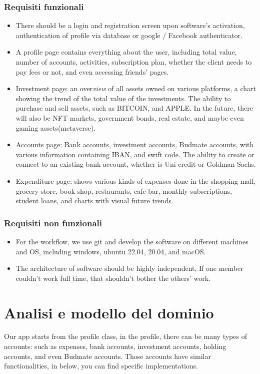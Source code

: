 \documentclass[a4paper,12pt]{report}
\begin{document}
\subsubsection{Requisiti funzionali}
\begin{itemize}
    \item There should be a login and registration screen upon software's activation, authentication of profile via database or google / Facebook authenticator.
    \item A profile page contains everything about the user, including total value, number of accounts, activities, subscription plan, whether the client needs to pay fees or not, and even accessing friends' pages.
    \item Investment page: an over\textit{view} of all assets owned on various platforms, a chart showing the trend of the total value of the investments. The ability to purchase and sell assets, such as BITCOIN, and APPLE. In the future, there will also be NFT markets, government bonds, real estate, and maybe even gaming assets(metaverse).
    \item Accounts page: Bank accounts, investment accounts, Budmate accounts, with various information containing IBAN, and swift code. 
    The ability to create or connect to an existing bank account, whether is Uni credit or Goldman Sachs.
    \item Expenditure page:  shows various kinds of expenses done in the shopping mall, grocery store, book shop, restaurants, cafe bar, monthly subscriptions, student loans, and charts with visual future trends.
\end{itemize}

\subsubsection{Requisiti non funzionali}
\begin{itemize}
    \item For the workflow, we use git and develop the software on different machines and OS, including windows, ubuntu 22.04, 20.04, and macOS. 
    \item The architecture of software should be highly independent, If one member couldn't work full time, that shouldn't bother the others' work.
\end{itemize}

\section{Analisi e modello del dominio}
Our app starts from the profile class, in the profile, there can be many types of accounts: 
such as expenses, bank accounts, investment accounts, holding accounts, and even Budmate accounts. Those accounts have similar functionalities, in below, you can find specific implementations.
\end{document}
